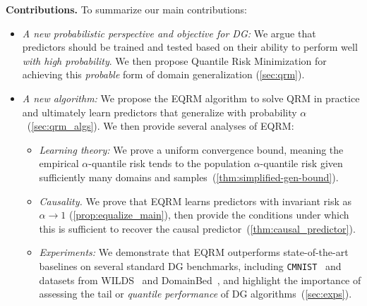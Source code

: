 \documentclass{article}
\begin{document}
\textbf{Contributions.} To summarize our main contributions:\vspace{-2mm}
\begin{itemize}
    \item {} \textit{A new probabilistic perspective and objective for DG:} We argue that predictors should be trained and tested based on their ability to perform well \emph{with high probability}. We then propose Quantile Risk Minimization for achieving this \emph{probable} form of domain generalization (\cref{sec:qrm}).
    \item \textit{A new algorithm:}  We propose the EQRM algorithm to solve QRM in practice and ultimately learn predictors that generalize with probability $\alpha$~(\cref{sec:qrm_algs}). We then provide several analyses of EQRM:\vspace{-0.75mm}
    \begin{itemize}
        \item \textit{Learning theory:}  We prove a uniform convergence bound, meaning the empirical $\alpha$-quantile risk tends to the population $\alpha$-quantile risk given sufficiently many domains and samples~(\cref{thm:simplified-gen-bound}).
        \item \textit{Causality.} We prove that EQRM learns predictors with invariant risk as $\alpha\! \to\! 1$ (\cref{prop:equalize_main}), then provide the conditions under which this is sufficient to 
        recover the causal predictor~(\cref{thm:causal_predictor}).
        \item \textit{Experiments:} We demonstrate that EQRM outperforms state-of-the-art baselines on several standard DG benchmarks, including \texttt{CMNIST}~\citep{arjovsky2020invariant} and datasets from WILDS~\citep{wilds2021} and DomainBed~\citep{gulrajani2020search}, and highlight the importance of assessing the tail or \emph{quantile performance} of DG algorithms~(\cref{sec:exps}).
    \end{itemize}
\end{itemize}
\end{document}
